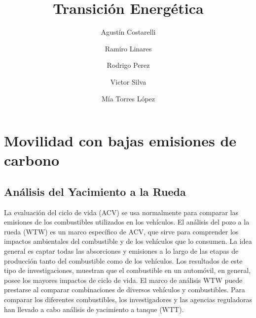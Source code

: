 \documentclass[runningheads]{llncs}
\begin{document}
\title{Transición Energética}

\author{Agustín Costarelli \and Ramiro Linares \and Rodrigo Perez \and Victor Silva \and Mía Torres López}
%
%
%
\maketitle

\section{Movilidad con bajas emisiones de carbono}



\subsection{Análisis del Yacimiento a la Rueda}
La evaluación del ciclo de vida (ACV) se usa normalmente para comparar las emisiones de los combustibles utilizados en los vehículos. El análisis del pozo a la rueda (WTW) es un marco específico de ACV, que sirve para comprender los impactos ambientales del combustible y de los vehículos que lo consumen. La idea general es captar todas las absorciones y emisiones a lo largo de las etapas de producción tanto del combustible como de los vehículos. Los resultados de este tipo de investigaciones, muestran que el combustible en un automóvil, en general, posee los mayores impactos de ciclo de vida. El marco de análisis WTW puede prestarse al comparar combinaciones de diversos vehículos y combustibles. Para comparar los diferentes combustibles, los investigadores y las agencias reguladoras han llevado a cabo análisis de yacimiento a tanque (WTT).
\end{document}
